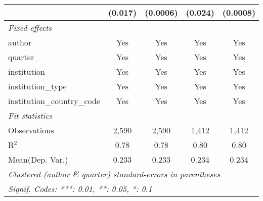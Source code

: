 \begin{tabular}{lcccc}
                                            & (0.017) & (0.0006) & (0.024) & (0.0008)\\   
   \midrule
   \emph{Fixed-effects}\\
   author                                   & Yes     & Yes      & Yes     & Yes\\  
   quarter                                  & Yes     & Yes      & Yes     & Yes\\  
   institution                              & Yes     & Yes      & Yes     & Yes\\  
   institution\_type                        & Yes     & Yes      & Yes     & Yes\\  
   institution\_country\_code               & Yes     & Yes      & Yes     & Yes\\  
   \midrule
   \emph{Fit statistics}\\
   Observations                             & 2,590   & 2,590    & 1,412   & 1,412\\  
   R$^2$                                    & 0.78    & 0.78     & 0.80    & 0.80\\  
Mean(Dep. Var.) & 0.233 & 0.233 & 0.234 & 0.234 \\
   \midrule \midrule
   \multicolumn{5}{l}{\emph{Clustered (author \& quarter) standard-errors in parentheses}}\\
   \multicolumn{5}{l}{\emph{Signif. Codes: ***: 0.01, **: 0.05, *: 0.1}}\\
\end{tabular}
\par\endgroup
